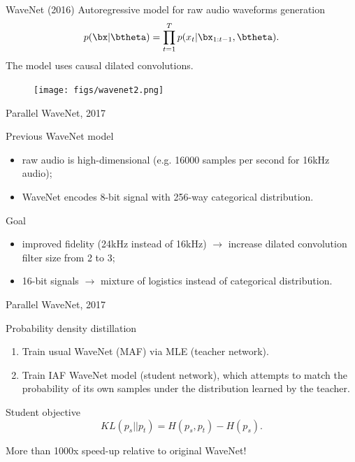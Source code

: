 \begin{frame}{WaveNet (2016)}
	Autoregressive model for raw audio waveforms generation
	\vspace{-0.2cm}
	\[
	p(\bx| \btheta) = \prod_{t=1}^T p(x_t|\bx_{1:t-1}, \btheta).
	\]
	\vspace{-0.2cm}
	The model uses causal dilated convolutions.
	\begin{figure}
		\centering
		\texttt{[image: figs/wavenet2.png]}
	\end{figure}
\end{frame}
\begin{frame}{Parallel WaveNet, 2017}
	\begin{block}{Previous WaveNet model}
		\begin{itemize}
			\item raw audio is high-dimensional (e.g. 16000 samples per second for 16kHz audio);
			\item WaveNet encodes 8-bit signal with 256-way categorical distribution.
		\end{itemize}
	\end{block}
	\begin{block}{Goal}
		\begin{itemize}
			\item improved fidelity (24kHz instead of 16kHz) $\rightarrow$ increase dilated convolution filter size from 2 to 3;
			\item 16-bit signals $\rightarrow$ mixture of logistics instead of categorical distribution.
		\end{itemize}
	\end{block}
\end{frame}
\begin{frame}{Parallel WaveNet, 2017}
	\begin{block}{Probability density distillation}
		\begin{enumerate}
			\item Train usual WaveNet (MAF) via MLE (teacher network).
			\item Train IAF WaveNet model (student network), which attempts to match the probability of its own samples under the distribution learned by the teacher.
		\end{enumerate}
	\end{block}
	\begin{block}{Student objective}
		\[
		KL(p_s || p_t) = H(p_s, p_t) - H(p_s).
		\]
	\end{block}
	More than 1000x speed-up relative to original WaveNet!
\end{frame}

